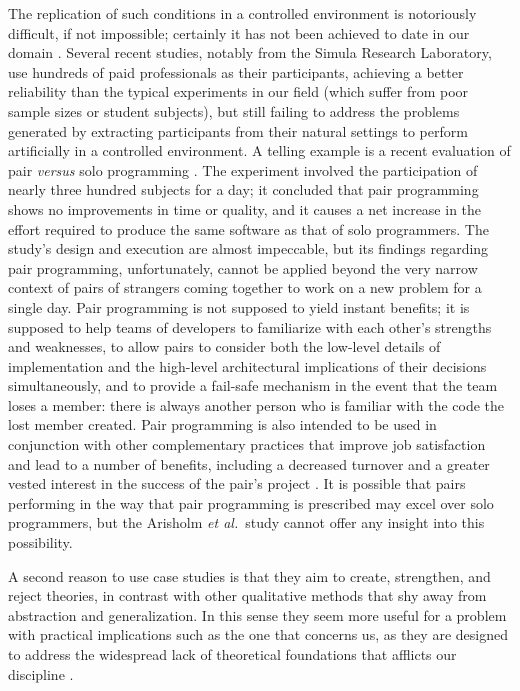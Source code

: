 The replication of such conditions in a controlled environment is notoriously difficult, if not impossible; certainly it has not been achieved to date in our domain \cite{Lung2008}. Several recent studies, notably from the Simula Research Laboratory, use hundreds of paid professionals as their participants, achieving a better reliability than the typical experiments in our field (which suffer from poor sample sizes or student subjects), but still failing to address the problems generated by extracting participants from their natural settings to perform artificially in a controlled environment. A telling example is a recent evaluation of pair \emph{versus} solo programming \cite{Arisholm2007}. The experiment involved the participation of nearly three hundred subjects for a day; it concluded that pair programming shows no improvements in time or quality, and it causes a net increase in the effort required to produce the same software as that of solo programmers. The study's design and execution are almost impeccable, but its findings regarding pair programming, unfortunately, cannot be applied beyond the very narrow context of pairs of strangers coming together to work on a new problem for a single day. Pair programming is not supposed to yield instant benefits; it is supposed to help teams of developers to familiarize with each other's strengths and weaknesses, to allow pairs to consider both the low-level details of implementation and the high-level architectural implications of their decisions simultaneously, and to provide a fail-safe mechanism in the event that the team loses a member: there is always another person who is familiar with the code the lost member created. Pair programming is also intended to be used in conjunction with other complementary practices that improve job satisfaction and lead to a number of benefits, including a decreased turnover and a greater vested interest in the success of the pair's project \cite{Beck1999}. It is possible that pairs performing in the way that pair programming is prescribed may excel over solo programmers, but the Arisholm \emph{et al.}\ study cannot offer any insight into this possibility.

A second reason to use case studies is that they aim to create, strengthen, and reject theories, in contrast with other qualitative methods that shy away from abstraction and generalization. In this sense they seem more useful for a problem with practical implications such as the one that concerns us, as they are designed to address the widespread lack of theoretical foundations that afflicts our discipline \cite{Hannay2007}.

